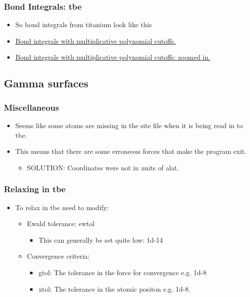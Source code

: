 \documentclass[11pt]{article}
\begin{document}
\subsubsection{Bond Integrals: tbe}
\label{sec:org245c8a6}
\begin{itemize}
\item So bond integrals from titanium look like this
\item \href{file:///home/tigany/Documents/ti/complete\_titanium/ti\_01-11-18/plot\_bond\_integrals/tbe\_bond\_integrals\_with\_polynomial\_cutoffs\_multiplicative\_alt.png}{Bond integrals with multiplicative polynomial cutoffs. }
\item \href{file:///home/tigany/Documents/ti/complete\_titanium/ti\_01-11-18/plot\_bond\_integrals/tbe\_bond\_integrals\_with\_polynomial\_cutoffs\_multiplicative\_zoomed\_in.png}{Bond integrals with multiplicative polynomial cutoffs: zoomed in.}
\end{itemize}

\subsection{Gamma surfaces}
\label{sec:orgc706fd9}
\subsubsection{Miscellaneous}
\label{sec:org0b42ebe}
\begin{itemize}
\item Seems like some atoms are missing in the site file when it is being read
in to tbe.
\item This means that there are some erroneous forces that make the program
exit.
\begin{itemize}
\item SOLUTION: Coordinates were not in units of alat.
\end{itemize}
\end{itemize}
\subsubsection{Relaxing in tbe}
\label{sec:orgad3d3f4}
\begin{itemize}
\item To relax in tbe need to modify:
\begin{itemize}
\item Ewald tolerance: ewtol
\begin{itemize}
\item This can generally be set quite low: 1d-14
\end{itemize}
\item Convergence criteria:
\begin{itemize}
\item gtol: The tolerance in the force for convergence e.g. 1d-8
\item xtol: The tolerance in the atomic positon e.g. 1d-8.
\end{itemize}
\end{itemize}
\end{itemize}
\end{document}

